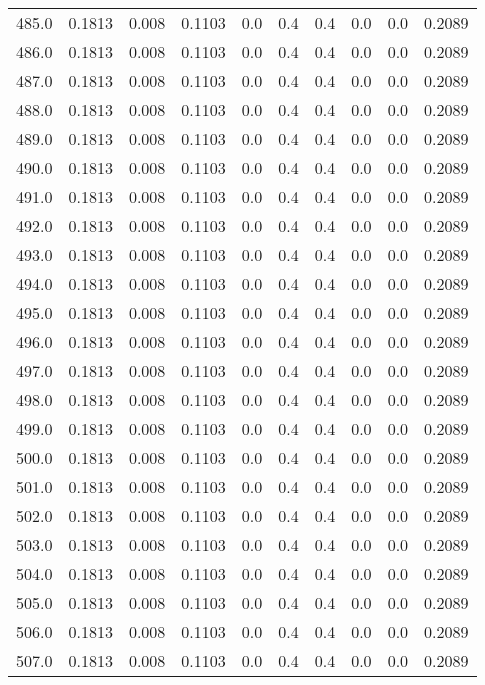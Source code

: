 \begin{longtable}{lrrrrrrrrr}
485.0 & 0.1813 & 0.008 & 0.1103 & 0.0 & 0.4 & 0.4 & 0.0 & 0.0 & 0.2089 \\
486.0 & 0.1813 & 0.008 & 0.1103 & 0.0 & 0.4 & 0.4 & 0.0 & 0.0 & 0.2089 \\
487.0 & 0.1813 & 0.008 & 0.1103 & 0.0 & 0.4 & 0.4 & 0.0 & 0.0 & 0.2089 \\
488.0 & 0.1813 & 0.008 & 0.1103 & 0.0 & 0.4 & 0.4 & 0.0 & 0.0 & 0.2089 \\
489.0 & 0.1813 & 0.008 & 0.1103 & 0.0 & 0.4 & 0.4 & 0.0 & 0.0 & 0.2089 \\
490.0 & 0.1813 & 0.008 & 0.1103 & 0.0 & 0.4 & 0.4 & 0.0 & 0.0 & 0.2089 \\
491.0 & 0.1813 & 0.008 & 0.1103 & 0.0 & 0.4 & 0.4 & 0.0 & 0.0 & 0.2089 \\
492.0 & 0.1813 & 0.008 & 0.1103 & 0.0 & 0.4 & 0.4 & 0.0 & 0.0 & 0.2089 \\
493.0 & 0.1813 & 0.008 & 0.1103 & 0.0 & 0.4 & 0.4 & 0.0 & 0.0 & 0.2089 \\
494.0 & 0.1813 & 0.008 & 0.1103 & 0.0 & 0.4 & 0.4 & 0.0 & 0.0 & 0.2089 \\
495.0 & 0.1813 & 0.008 & 0.1103 & 0.0 & 0.4 & 0.4 & 0.0 & 0.0 & 0.2089 \\
496.0 & 0.1813 & 0.008 & 0.1103 & 0.0 & 0.4 & 0.4 & 0.0 & 0.0 & 0.2089 \\
497.0 & 0.1813 & 0.008 & 0.1103 & 0.0 & 0.4 & 0.4 & 0.0 & 0.0 & 0.2089 \\
498.0 & 0.1813 & 0.008 & 0.1103 & 0.0 & 0.4 & 0.4 & 0.0 & 0.0 & 0.2089 \\
499.0 & 0.1813 & 0.008 & 0.1103 & 0.0 & 0.4 & 0.4 & 0.0 & 0.0 & 0.2089 \\
500.0 & 0.1813 & 0.008 & 0.1103 & 0.0 & 0.4 & 0.4 & 0.0 & 0.0 & 0.2089 \\
501.0 & 0.1813 & 0.008 & 0.1103 & 0.0 & 0.4 & 0.4 & 0.0 & 0.0 & 0.2089 \\
502.0 & 0.1813 & 0.008 & 0.1103 & 0.0 & 0.4 & 0.4 & 0.0 & 0.0 & 0.2089 \\
503.0 & 0.1813 & 0.008 & 0.1103 & 0.0 & 0.4 & 0.4 & 0.0 & 0.0 & 0.2089 \\
504.0 & 0.1813 & 0.008 & 0.1103 & 0.0 & 0.4 & 0.4 & 0.0 & 0.0 & 0.2089 \\
505.0 & 0.1813 & 0.008 & 0.1103 & 0.0 & 0.4 & 0.4 & 0.0 & 0.0 & 0.2089 \\
506.0 & 0.1813 & 0.008 & 0.1103 & 0.0 & 0.4 & 0.4 & 0.0 & 0.0 & 0.2089 \\
507.0 & 0.1813 & 0.008 & 0.1103 & 0.0 & 0.4 & 0.4 & 0.0 & 0.0 & 0.2089 \\

\end{longtable}
